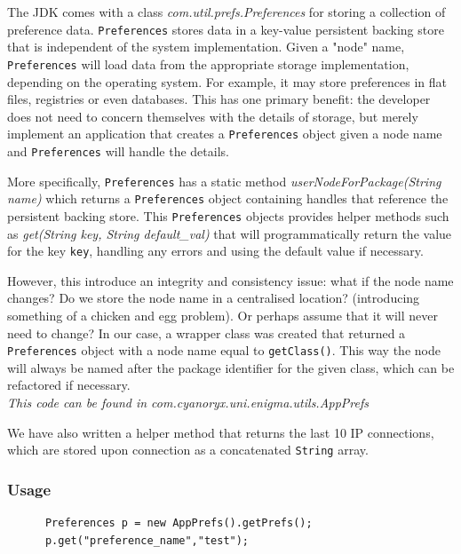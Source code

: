   The JDK comes with a class \emph{com.util.prefs.Preferences} for storing a collection of preference data. \verb!Preferences! stores data in a key-value persistent backing store that is independent of the system implementation. Given a "node" name, \verb!Preferences! will load data from the appropriate storage implementation, depending on the operating system. For example, it may store preferences in flat files, registries or even databases. This has one primary benefit: the developer does not need to concern themselves with the details of storage, but merely implement an application that creates a \verb!Preferences! object given a node name and \verb!Preferences! will handle the details.
  
  More specifically, \verb!Preferences! has a static method \emph{userNodeForPackage(String name)} which returns a \verb!Preferences! object containing handles that reference the persistent backing store. This \verb!Preferences! objects provides helper methods such as \emph{get(String key, String default\_val)} that will programmatically return the value for the key \verb!key!, handling any errors and using the default value if necessary. 
  
  However, this introduce an integrity and consistency issue: what if the node name changes? Do we store the node name in a centralised location? (introducing something of a chicken and egg problem). Or perhaps assume that it will never need to change? In our case, a wrapper class was created that returned a \verb!Preferences! object with a node name equal to \verb!getClass()!. This way the node will always be named after the package identifier for the given class, which can be refactored if necessary. \\
  
  
  
  \emph{This code can be found in com.cyanoryx.uni.enigma.utils.AppPrefs}
  
  We have also written a helper method that returns the last 10 IP connections, which are stored upon connection as a concatenated \verb!String! array.
  
    \subsubsection{Usage}
    
    \begin{lstlisting}
      Preferences p = new AppPrefs().getPrefs();
      p.get("preference_name","test");
\end{lstlisting}
  
